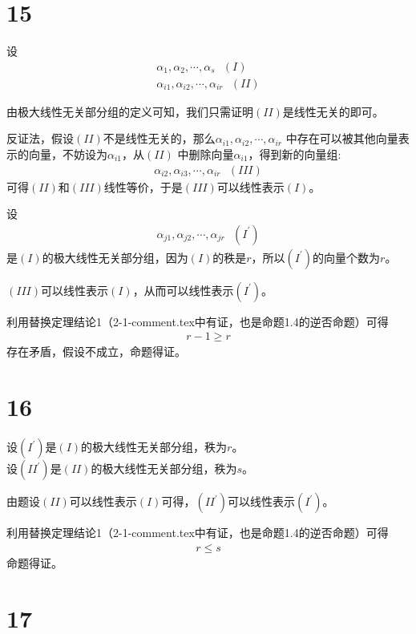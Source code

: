 \documentclass{article}
\begin{document}
\section*{15}

设
\begin{align*}
  \alpha_1, \alpha_2, \cdots, \alpha_s \ \ \ (I) \\
  \alpha_{i1}, \alpha_{i2}, \cdots, \alpha_{ir} \ \ \ (II)
\end{align*}

由极大线性无关部分组的定义可知，我们只需证明$(II)$是线性无关的即可。

反证法，假设$(II)$不是线性无关的，那么$\alpha_{i1}, \alpha_{i2}, \cdots, \alpha_{ir}$
中存在可以被其他向量表示的向量，不妨设为$\alpha_{i1}$，从$(II)$
中删除向量$\alpha_{i1}$，得到新的向量组:
\begin{align*}
  \alpha_{i2}, \alpha_{i3}, \cdots, \alpha_{ir} \ \ \ (III)
\end{align*}
可得$(II)$和$(III)$线性等价，于是$(III)$可以线性表示$(I)$。

设
\begin{align*}
  \alpha_{j1}, \alpha_{j2}, \cdots, \alpha_{jr} \ \ \ (I^\prime)
\end{align*}
是$(I)$的极大线性无关部分组，因为$(I)$的秩是$r$，所以$(I^\prime)$的向量个数为$r$。

$(III)$可以线性表示$(I)$，从而可以线性表示$(I^\prime)$。

利用替换定理结论1（2-1-comment.tex中有证，也是命题1.4的逆否命题）可得
\begin{align*}
  r - 1 \geq r
\end{align*}
存在矛盾，假设不成立，命题得证。

\section*{16}

设$(I^\prime)$是$(I)$的极大线性无关部分组，秩为$r$。\\
设$(II^\prime)$是$(II)$的极大线性无关部分组，秩为$s$。

由题设$(II)$可以线性表示$(I)$可得，$(II^\prime)$可以线性表示$(I^\prime)$。

利用替换定理结论1（2-1-comment.tex中有证，也是命题1.4的逆否命题）可得
\begin{align*}
  r \leq s
\end{align*}
命题得证。

\section*{17}
\end{document}
